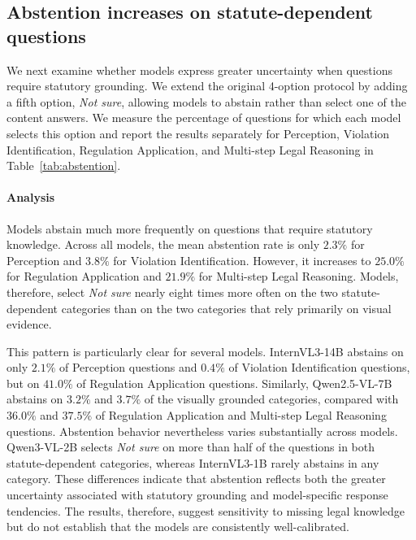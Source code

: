 \subsection{Abstention increases on statute-dependent questions}
\label{sec:abstain}
We next examine whether models express greater uncertainty when questions require statutory grounding. We extend the original 4-option protocol by adding a fifth option, \textit{Not sure}, allowing models to abstain rather than select one of the content answers. We measure the percentage of questions for which each model selects this option and report the results separately for Perception, Violation Identification, Regulation Application, and Multi-step Legal Reasoning in Table~\ref{tab:abstention}.


\paragraph{Analysis}
Models abstain much more frequently on questions that require statutory knowledge. Across all models, the mean abstention rate is only $2.3\%$ for Perception and $3.8\%$ for Violation Identification. However, it increases to $25.0\%$ for Regulation Application and $21.9\%$ for Multi-step Legal Reasoning. Models, therefore, select \textit{Not sure} nearly eight times more often on the two statute-dependent categories than on the two categories that rely primarily on visual evidence.

This pattern is particularly clear for several models. InternVL3-14B abstains on only $2.1\%$ of Perception questions and $0.4\%$ of Violation Identification questions, but on $41.0\%$ of Regulation Application questions. Similarly, Qwen2.5-VL-7B abstains on $3.2\%$ and $3.7\%$ of the visually grounded categories, compared with $36.0\%$ and $37.5\%$ of Regulation Application and Multi-step Legal Reasoning questions. Abstention behavior nevertheless varies substantially across models. Qwen3-VL-2B selects \textit{Not sure} on more than half of the questions in both statute-dependent categories, whereas InternVL3-1B rarely abstains in any category. These differences indicate that abstention reflects both the greater uncertainty associated with statutory grounding and model-specific response tendencies. The results, therefore, suggest sensitivity to missing legal knowledge but do not establish that the models are consistently well-calibrated.


